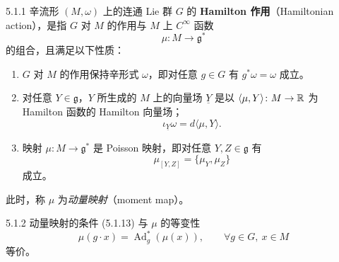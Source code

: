 \begin{definition}{5.1.1}
  辛流形 $(M,\omega)$ 上的连通 Lie 群 $G$ 的 \textbf{Hamilton 作用}（Hamiltonian action），是指 $G$ 对 $M$ 的作用与 $M$ 上 $C^\infty$ 函数
  \begin{equation}
    \mu\colon M\to\mathfrak{g}^*
    \tag{5.1.11}
  \end{equation}
  的组合，且满足以下性质：
  \begin{enumerate}
    \item $G$ 对 $M$ 的作用保持辛形式 $\omega$，即对任意 $g\in G$ 有 $g^*\omega=\omega$ 成立。
    \item 对任意 $Y\in\mathfrak{g}$，$Y$ 所生成的 $M$ 上的向量场 $\underline{Y}$ 是以 $\langle\mu,Y\rangle\colon M\to\mathbb{R}$ 为 Hamilton 函数的 Hamilton 向量场；
    \begin{equation}
      \iota_{\underline{Y}}\omega=d\langle\mu,Y\rangle.
      \tag{5.1.12}
    \end{equation}
    \item 映射 $\mu\colon M\to\mathfrak{g}^*$ 是 Poisson 映射，即对任意 $Y,Z\in\mathfrak{g}$ 有
    \begin{equation}
      \mu_{[Y,Z]}=\{\mu_Y,\mu_Z\}
      \tag{5.1.13}
    \end{equation}
    成立。
  \end{enumerate}
  此时，称 $\mu$ 为\emph{动量映射}（moment map）。
\end{definition}

\begin{proposition*}{5.1.2}
  动量映射的条件 (5.1.13) 与 $\mu$ 的等变性
  \begin{equation}
    \mu(g\cdot x)=\operatorname{Ad}^*_g(\mu(x)),\qquad \forall g\in G,\ x\in M
    \tag{5.1.14}
  \end{equation}
  等价。
\end{proposition*}

